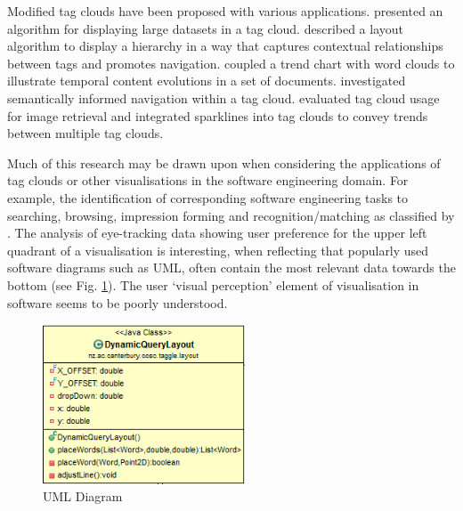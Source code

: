 Modified tag clouds have been proposed with various applications. \citet{Fujimara08} presented an algorithm for displaying large datasets in a tag cloud. \citet{Candan08} described a layout algorithm to display a hierarchy in a way that captures contextual relationships between tags and promotes navigation. \citet{Cui10} coupled a trend chart with word clouds to illustrate temporal content evolutions in a set of documents. \citet{dicaro08} investigated semantically informed navigation within a tag cloud. \citet{callegari10} evaluated tag cloud usage for image retrieval and \citet{lee10} integrated sparklines into tag clouds to convey trends between multiple tag clouds.


Much of this research may be drawn upon when considering the applications of tag clouds or other visualisations in the software engineering domain. For example, the identification of corresponding software engineering tasks to searching, browsing, impression forming and recognition/matching as classified by \citet{rivadeneira07}. The analysis of eye-tracking data showing user preference for the upper left quadrant of a visualisation \citep{lohmann09, schrammel09} is interesting, when reflecting that popularly used software diagrams such as UML, often contain the most relevant data towards the bottom (see Fig. \ref{fig:umldiagram}). The user `visual perception' element of visualisation in software seems to be poorly understood.

\begin{figure}[h!]
   \centering
   \includegraphics[width=60mm]{uml.png}
  \caption{UML Diagram}
  \label{fig:umldiagram}
\end{figure}




